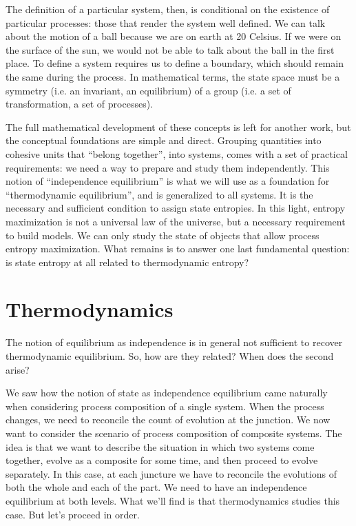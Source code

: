 \documentclass[letterpaper,twocolumn]{article}
\begin{document}
The definition of a particular system, then, is conditional on the existence of particular processes: those that render the system well defined. We can talk about the motion of a ball because we are on earth at 20 Celsius. If we were on the surface of the sun, we would not be able to talk about the ball in the first place. To define a system requires us to define a boundary, which should remain the same during the process. In mathematical terms, the state space must be a symmetry (i.e. an invariant, an equilibrium) of a group (i.e. a set of transformation, a set of processes).

The full mathematical development of these concepts is left for another work, but the conceptual foundations are simple and direct. Grouping quantities into cohesive units that ``belong together'', into systems, comes with a set of practical requirements: we need a way to prepare and study them independently. This notion of ``independence equilibrium'' is what we will use as a foundation for ``thermodynamic equilibrium'', and is generalized to all systems. It is the necessary and sufficient condition to assign state entropies. In this light, entropy maximization is not a universal law of the universe, but a necessary requirement to build models. We can only study the state of objects that allow process entropy maximization. What remains is to answer one last fundamental question: is state entropy at all related to thermodynamic entropy?

\section{Thermodynamics}

The notion of equilibrium as independence is in general not sufficient to recover thermodynamic equilibrium. So, how are they related? When does the second arise?

We saw how the notion of state as independence equilibrium came naturally when considering process composition of a single system. When the process changes, we need to reconcile the count of evolution at the junction. We now want to consider the scenario of process composition of composite systems. The idea is that we want to describe the situation in which two systems come together, evolve as a composite for some time, and then proceed to evolve separately. In this case, at each juncture we have to reconcile the evolutions of both the whole and each of the part. We need to have an independence equilibrium at both levels. What we'll find is that thermodynamics studies this case. But let's proceed in order.
\end{document}
